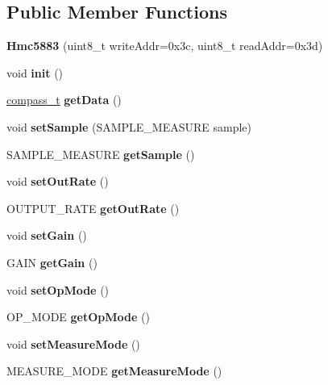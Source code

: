 \subsection*{Public Member Functions}
\begin{DoxyCompactItemize}
\item 
\mbox{\label{classHmc5883_ac524eb35511c0cc1af4fde7c25ce6bc8}} 
{\bfseries Hmc5883} (uint8\+\_\+t write\+Addr=0x3c, uint8\+\_\+t read\+Addr=0x3d)
\item 
\mbox{\label{classHmc5883_ab21eb9fe07af129ca5f838b568183d7b}} 
void {\bfseries init} ()
\item 
\mbox{\label{classHmc5883_a11189f87dac5ff48217551fc76d3c93b}} 
\mbox{\hyperlink{structcompass__t}{compass\+\_\+t}} {\bfseries get\+Data} ()
\item 
\mbox{\label{classHmc5883_a69dbf7355977a9b33ca7910d8f716095}} 
void {\bfseries set\+Sample} (S\+A\+M\+P\+L\+E\+\_\+\+M\+E\+A\+S\+U\+RE sample)
\item 
\mbox{\label{classHmc5883_aa2592ac2bfc5a4e98c13ed278fa8f414}} 
S\+A\+M\+P\+L\+E\+\_\+\+M\+E\+A\+S\+U\+RE {\bfseries get\+Sample} ()
\item 
\mbox{\label{classHmc5883_af850118d4a20b7622aa796d8dbca5662}} 
void {\bfseries set\+Out\+Rate} ()
\item 
\mbox{\label{classHmc5883_a692ad42338c883012ec5b11347e1bfd8}} 
O\+U\+T\+P\+U\+T\+\_\+\+R\+A\+TE {\bfseries get\+Out\+Rate} ()
\item 
\mbox{\label{classHmc5883_a106b6982d67ef293f8f4d7f5dd3bff46}} 
void {\bfseries set\+Gain} ()
\item 
\mbox{\label{classHmc5883_a9a2dc9a1b419a096ebf7aacb1a2e0ef3}} 
G\+A\+IN {\bfseries get\+Gain} ()
\item 
\mbox{\label{classHmc5883_a4f244d6aa1a8f37f7ca77bc4d456ba85}} 
void {\bfseries set\+Op\+Mode} ()
\item 
\mbox{\label{classHmc5883_a522657db88177c0cca2b64741f796e7d}} 
O\+P\+\_\+\+M\+O\+DE {\bfseries get\+Op\+Mode} ()
\item 
\mbox{\label{classHmc5883_a3264769daed5ee49c9ce3011b07abc3d}} 
void {\bfseries set\+Measure\+Mode} ()
\item 
\mbox{\label{classHmc5883_ac514cf477af1b8f325bc9d3d7837d5ff}} 
M\+E\+A\+S\+U\+R\+E\+\_\+\+M\+O\+DE {\bfseries get\+Measure\+Mode} ()
\end{DoxyCompactItemize}

